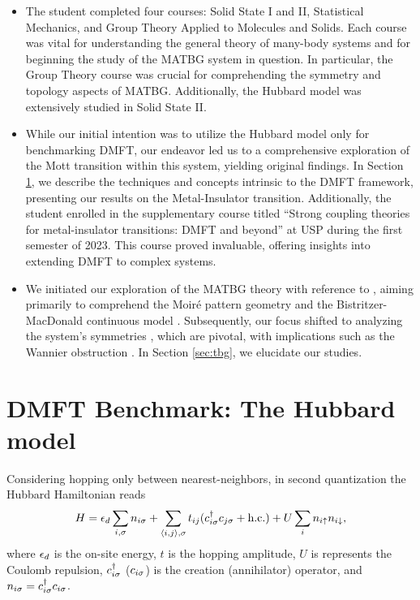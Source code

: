 \documentclass[12pt]{report}
\begin{document}
\begin{itemize}
\item The student completed four courses: Solid State I and II, Statistical Mechanics, and Group Theory Applied to Molecules and Solids. Each course was vital for understanding the general theory of many-body systems and for beginning the study of the MATBG system in question. In particular, the Group Theory course was crucial for comprehending the symmetry and topology aspects of MATBG. Additionally, the Hubbard model was extensively studied in Solid State II.

\item While our initial intention was to utilize the Hubbard model only for benchmarking DMFT, our endeavor led us to a comprehensive exploration of the Mott transition within this system, yielding original findings. In Section \ref{sec:hubbard}, we describe the techniques and concepts intrinsic to the DMFT framework, presenting our results on the Metal-Insulator transition. Additionally, the student enrolled in the supplementary course titled ``Strong coupling theories for metal-insulator transitions: DMFT and beyond'' at USP during the first semester of 2023. This course proved invaluable, offering insights into extending DMFT to complex systems.

\item We initiated our exploration of the MATBG theory with reference to \cite{handbook2019}, aiming primarily to comprehend the Moiré pattern geometry and the Bistritzer-MacDonald continuous model \cite{macdonald2011}. Subsequently, our focus shifted to analyzing the system's symmetries \cite{thesis_rennella}, which are pivotal, with implications such as the Wannier obstruction \cite{zou2018}. In Section \ref{sec:tbg}, we elucidate our studies.
\end{itemize}


\section{DMFT Benchmark: The Hubbard model} \label{sec:hubbard}

Considering hopping only between nearest-neighbors, in second quantization the Hubbard Hamiltonian reads
\begin{equation} \label{eq:hubbard-hamiltonian}
H = \epsilon_d \sum_{i, {\sigma}} n_{i{\sigma}} +  \sum_{\left\langle i , j \right\rangle, {\sigma}} t_{ij} (c_{i{\sigma}}^\dagger c_{j{\sigma}} + {\text{h.c.}})
+ U \sum_{i} n_{i{\uparrow}} n_{i{\downarrow}},
\end{equation}
where $\epsilon_d$ is the on-site energy, $t$ is the hopping amplitude, $U$ is represents the Coulomb repulsion, $c_{i{\sigma}}^\dagger$ ($c_{i{\sigma}}$) is the creation (annihilator) operator, and $n_{i{\sigma}} = c_{i{\sigma}}^\dagger c_{i{\sigma}}$.
\end{document}
